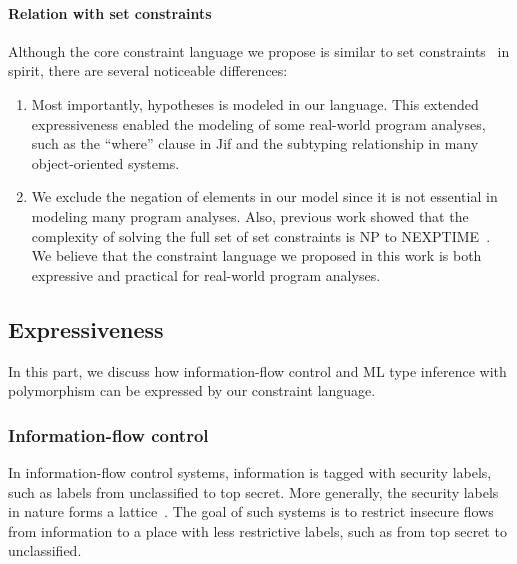 \paragraph{Relation with set constraints}

Although the core constraint language we propose is similar to set
constraints~\cite{aiken-setconstraint} in spirit, there are several
noticeable differences:

\begin{enumerate}

\item Most importantly, hypotheses is modeled in our language. This extended
expressiveness enabled the modeling of some real-world program analyses, such
as the ``where'' clause in Jif and the subtyping relationship in many
object-oriented systems. 

\item We exclude the negation of elements in our model since it is not
essential in modeling many program analyses. Also, previous work showed that
the complexity of solving the full set of set constraints is NP to
NEXPTIME~\cite{aiken-complexity}. We believe that the constraint language we
proposed in this work is both expressive and practical for real-world program
analyses.

\end{enumerate}

\subsection{Expressiveness}


In this part, we discuss how information-flow control and ML type inference
with polymorphism can be expressed by our constraint language.

\subsubsection{Information-flow control}

In information-flow control systems, information is tagged with security
labels, such as labels from unclassified to top secret. More generally, the
security labels in nature forms a lattice~\cite{denning-lattice}. The goal of
such systems is to restrict insecure flows from information to a place with
less restrictive labels, such as from top secret to unclassified. 

